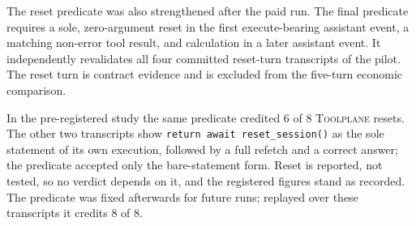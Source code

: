 \documentclass[10pt,twocolumn]{article}
\newcommand{\toolplane}{\textsc{Toolplane}\xspace}
\begin{document}
The reset predicate was also strengthened after the paid run.  The final
predicate requires a sole, zero-argument reset in the first execute-bearing
assistant event, a matching non-error tool result, and calculation in a later
assistant event.  It independently revalidates all four committed reset-turn
transcripts of the pilot.  The reset turn is contract evidence and is excluded
from the five-turn economic comparison.

In the pre-registered study the same predicate credited 6 of 8 \toolplane
resets.  The other two transcripts show \texttt{return await reset\_session()}
as the sole statement of its own execution, followed by a full refetch and a
correct answer; the predicate accepted only the bare-statement form.  Reset is
reported, not tested, so no verdict depends on it, and the registered figures
stand as recorded.  The predicate was fixed afterwards for future runs; replayed
over these transcripts it credits 8 of 8.
\end{document}
